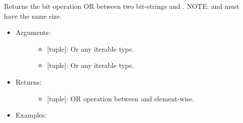 \documentclass[letterpaper,10pt,english]{sphinxmanual}
\begin{document}
\begin{fulllineitems}
\label{\detokenize{sets:data_tools.sets.bit_or}}
Returns the bit operation OR between two bit-strings  and .
NOTE:  and  must have the same size.
\begin{itemize}
\item {} \begin{description}
\item[{Arguments:}] \leavevmode\begin{itemize}
\item {} 
 {[}tuple{]}: Or any iterable type.

\item {} 
 {[}tuple{]}: Or any iterable type.

\end{itemize}

\end{description}

\item {} \begin{description}
\item[{Returns:}] \leavevmode\begin{itemize}
\item {} 
{[}tuple{]}: OR operation between  and  element-wise.

\end{itemize}

\end{description}

\item {} \begin{description}
\item[{Examples:}] \leavevmode
{}%
\begin{sphinxVerbatim}[commandchars=\\\{\}]
        
 
\end{sphinxVerbatim}

\end{description}

\end{itemize}

\end{fulllineitems}
\end{document}
